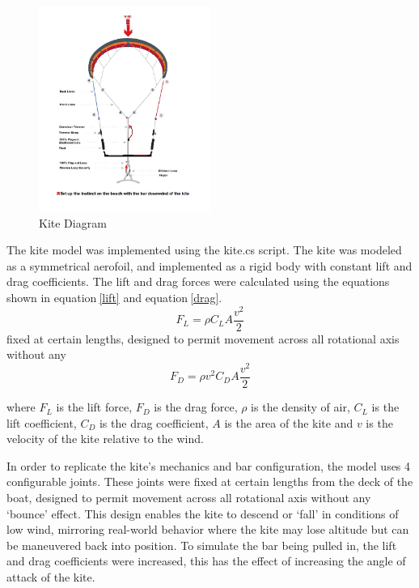 \begin{figure}[h]
    \centering
    \includegraphics[width=0.5\textwidth]{Images/kitediagram.jpg}
    \caption{Kite Diagram}\label{kite_diagram}
\end{figure}

The kite model was implemented using the kite.cs script. The kite was modeled as a symmetrical aerofoil, and implemented as a rigid body with constant lift and drag coefficients. The lift and drag forces were calculated using the equations shown in equation$~$\ref{lift} and equation$~$\ref{drag}.
\begin{equation}
    F_L = \rho C_L A \frac{v^2}{2} 
    \label{lift}
\end{equation}fixed at certain lengths, designed to permit movement across all rotational axis without any
\begin{equation}
    F_D = \rho v^2 C_D A \frac{v^2}{2} 
    \label{drag}
\end{equation}

where $F_L$ is the lift force, $F_D$ is the drag force, $\rho$ is the density of air, $C_L$ is the lift coefficient, $C_D$ is the drag coefficient, $A$ is the area of the kite and $v$ is the velocity of the kite relative to the wind.

In order to replicate the kite's mechanics and bar configuration, the model uses 4 configurable joints. These joints were fixed at certain lengths from the deck of the boat, designed to permit movement across all rotational axis without any `bounce' effect. This design enables the kite to descend or `fall' in conditions of low wind, mirroring real-world behavior where the kite may lose altitude but can be maneuvered back into position. To simulate the bar being pulled in, the lift and drag coefficients were increased, this has the effect of increasing the angle of attack of the kite.


